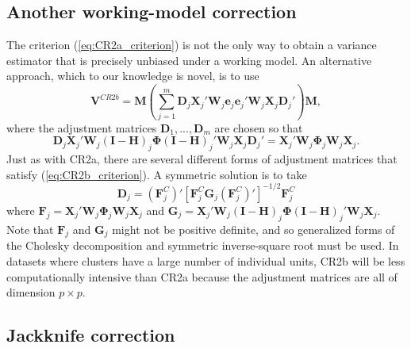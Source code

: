 \documentclass[12pt]{article}\usepackage[]{graphicx}\usepackage[]{color}
\newcommand{\bm}{\mathbf}
\newcommand{\bs}{\boldsymbol}
\begin{document}
\subsection{Another working-model correction}

The criterion (\ref{eq:CR2a_criterion}) is not the only way to obtain a variance estimator that is precisely unbiased under a working model. An alternative approach, which to our knowledge is novel, is to use
\begin{equation}
\label{eq:V_CR2b}
\bm{V}^{CR2b} = \bm{M} \left(\sum_{j=1}^m \bm{D}_j \bm{X}_j' \bm{W}_j \bm{e}_j \bm{e}_j' \bm{W}_j \bm{X}_j \bm{D}_j'\right) \bm{M},
\end{equation}
where the adjustment matrices $\bm{D}_1,...,\bm{D}_m$ are chosen so that
\begin{equation}
\label{eq:CR2b_criterion}
\bm{D}_j \bm{X}_j' \bm{W}_j \left(\bm{I} - \bm{H}\right)_j \bs\Phi \left(\bm{I} - \bm{H}\right)_j' \bm{W}_j \bm{X}_j \bm{D}_j' = \bm{X}_j' \bm{W}_j \bs\Phi_j \bm{W}_j \bm{X}_j.
\end{equation}
Just as with CR2a, there are several different forms of adjustment matrices that satisfy (\ref{eq:CR2b_criterion}). 
A symmetric solution is to take
\begin{equation}
\bm{D}_j = \left(\bm{F}_j^C\right)'\left[\bm{F}_j^C \bm{G}_j \left(\bm{F}_j^C\right)'\right]^{-1/2}\bm{F}_j^C
\end{equation}
where $\bm{F}_j = \bm{X}_j' \bm{W}_j \bs\Phi_j \bm{W}_j \bm{X}_j$ and $\bm{G}_j = \bm{X}_j' \bm{W}_j \left(\bm{I} - \bm{H}\right)_j \bs\Phi \left(\bm{I} - \bm{H}\right)_j' \bm{W}_j \bm{X}_j$. Note that $\bm{F}_j$ and $\bm{G}_j$ might not be positive definite, and so generalized forms of the Cholesky decomposition and symmetric inverse-square root must be used. In datasets where clusters have a large number of individual units, CR2b will be less computationally intensive than CR2a because the adjustment matrices are all of dimension $p \times p$.

\subsection{Jackknife correction}
\end{document}
